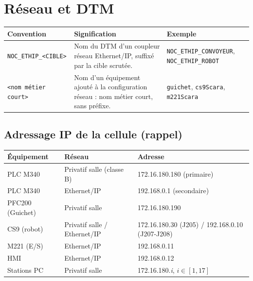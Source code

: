 \section{Réseau et DTM}
\label{secReseauDtm}

\begin{center}
    \begin{tabular}{|p{3.8cm}|p{6.4cm}|p{4cm}|}
        \hline
        \textbf{Convention} & \textbf{Signification} & \textbf{Exemple} \\
        \hline
        \texttt{NOC\_ETHIP\_<CIBLE>} & Nom du DTM d'un coupleur réseau Ethernet/IP, suffixé par la cible scrutée. & \texttt{NOC\_ETHIP\_CONVOYEUR}, \texttt{NOC\_ETHIP\_ROBOT} \\
        \hline
        \texttt{<nom métier court>} & Nom d'un équipement ajouté à la configuration réseau : nom métier court, sans préfixe. & \texttt{guichet}, \texttt{cs9Scara}, \texttt{m221Scara} \\
        \hline
    \end{tabular}
\end{center}

\subsection{Adressage IP de la cellule (rappel)}

\begin{center}
    \begin{tabular}{|p{4.6cm}|p{4.4cm}|p{5.2cm}|}
        \hline
        \textbf{Équipement} & \textbf{Réseau} & \textbf{Adresse} \\
        \hline
        PLC M340 & Privatif salle (classe B) & 172.16.180.180 (primaire) \\
        \hline
        PLC M340 & Ethernet/IP & 192.168.0.1 (secondaire) \\
        \hline
        PFC200 (Guichet) & Privatif salle & 172.16.180.190 \\
        \hline
        CS9 (robot) & Privatif salle / Ethernet/IP & 172.16.180.30 (J205) / 192.168.0.10 (J207-J208) \\
        \hline
        M221 (E/S) & Ethernet/IP & 192.168.0.11 \\
        \hline
        HMI & Ethernet/IP & 192.168.0.12 \\
        \hline
        Stations PC & Privatif salle & 172.16.180.\emph{i}, $i \in [1,17]$ \\
        \hline
    \end{tabular}
\end{center}
